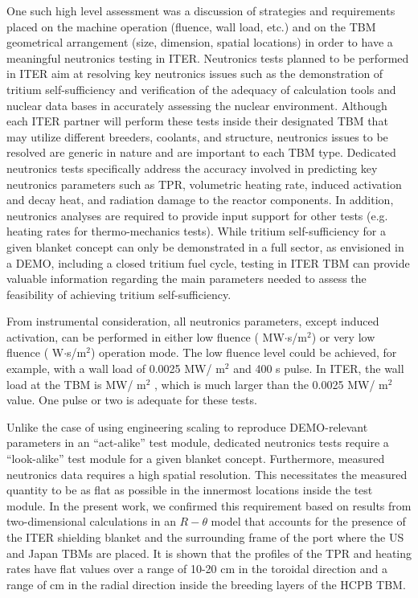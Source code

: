 One such high level assessment was a discussion of strategies and requirements
placed on the machine operation (fluence, wall load, etc.) and on the
\gls{TBM} geometrical arrangement (size, dimension, spatial locations) in
order to have a meaningful neutronics testing in ITER.  Neutronics tests
planned to be performed in ITER aim at resolving key neutronics issues such as
the demonstration of tritium self-sufficiency and verification of the adequacy
of calculation tools and nuclear data bases in accurately assessing the
nuclear environment.  Although each ITER partner will perform these tests
inside their designated \gls{TBM} that may utilize different breeders,
coolants, and structure, neutronics issues to be resolved are generic in
nature and are important to each TBM type. Dedicated neutronics tests
specifically address the accuracy involved in predicting key neutronics
parameters such as \gls{TPR}, volumetric heating rate, induced activation and
decay heat, and radiation damage to the reactor components. In addition,
neutronics analyses are required to provide input support for other tests
(e.g.  heating rates for thermo-mechanics tests). While tritium
self-sufficiency for a given blanket concept can only be demonstrated in a
full sector, as envisioned in a DEMO, including a closed tritium fuel cycle,
testing in ITER TBM can provide valuable information regarding the main
parameters needed to assess the feasibility of achieving tritium
self-sufficiency.

From instrumental consideration, all neutronics parameters, except induced
activation, can be performed in either low fluence ( MW$\cdot$s/m$^2$)
or very low fluence ( W$\cdot$s/m$^2$) operation mode. The low fluence
level could be achieved, for example, with a wall load of 0.0025 MW/ m$^2$ and
400 s pulse. In ITER, the wall load at the \gls{TBM} is  MW/
m$^2$ , which is much larger than the 0.0025 MW/ m$^2$ value. One pulse or two
is adequate for these tests.

Unlike the case of using engineering scaling to reproduce DEMO-relevant
parameters in an ``act-alike'' test module, dedicated neutronics tests require a
``look-alike'' test module for a given blanket concept. Furthermore, measured
neutronics data requires a high spatial resolution. This necessitates the
measured quantity to be as flat as possible in the innermost locations inside
the test module. In the present work, we confirmed this requirement based on
results from two-dimensional calculations in an $R-\theta$ model that accounts
for the presence of the ITER shielding blanket and the surrounding frame of
the port where the US and Japan \gls{TBM}s are placed. It is shown that the
profiles of the \gls{TPR} and heating rates have flat values over a range of
10-20 cm in the toroidal direction and a range of  cm in the
radial direction inside the breeding layers of the \gls{HCPB}
\gls{TBM}. 

